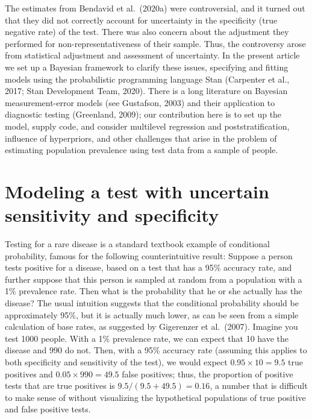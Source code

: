 \documentclass[11pt]{article}
\begin{document}
The estimates from Bendavid et al.\ (2020a) were controversial, and it turned out that they did not correctly account for uncertainty in the specificity (true negative rate) of the test.  There was also concern about the adjustment they performed for non-representativeness of their sample.  Thus, the controversy arose from statistical adjustment and assessment of uncertainty.  In the present article we set up a Bayesian framework to clarify these issues, specifying and fitting models using the probabilistic programming language Stan (Carpenter et al., 2017; Stan Development Team, 2020).  There is a long literature on Bayesian measurement-error models (see Gustafson, 2003) and their application to diagnostic testing (Greenland, 2009); our contribution here is to set up the model, supply code, and consider multilevel regression and poststratification, influence of hyperpriors, and other challenges that arise in the problem of estimating population prevalence using test data from a sample of people.


\section{Modeling a test with uncertain sensitivity and specificity}\label{model1}

Testing for a rare disease is a standard textbook example of conditional probability, famous for the following counterintuitive result:  Suppose a person tests positive for a disease, based on a test that has a 95\% accuracy rate, and further suppose that this person is sampled at random from a population with a 1\% prevalence rate.  Then what is the probability that he or she actually has the disease? The usual intuition suggests that the conditional probability should be approximately 95\%, but it is actually much lower, as can be seen from a simple calculation of base rates, as suggested by Gigerenzer et al.\ (2007).  Imagine you test 1000 people.  With a 1\% prevalence rate, we can expect that 10 have the disease and 990 do not.  Then, with a 95\% accuracy rate (assuming this applies to both specificity and sensitivity of the test), we would expect $0.95 \times 10=9.5$ true positives and $0.05 \times 990 =  49.5$ false positives; thus, the proportion of positive tests that are true positives is $9.5/(9.5+49.5) = 0.16$, a number that is difficult to make sense of without visualizing the hypothetical populations of true positive and false positive tests.
\end{document}
